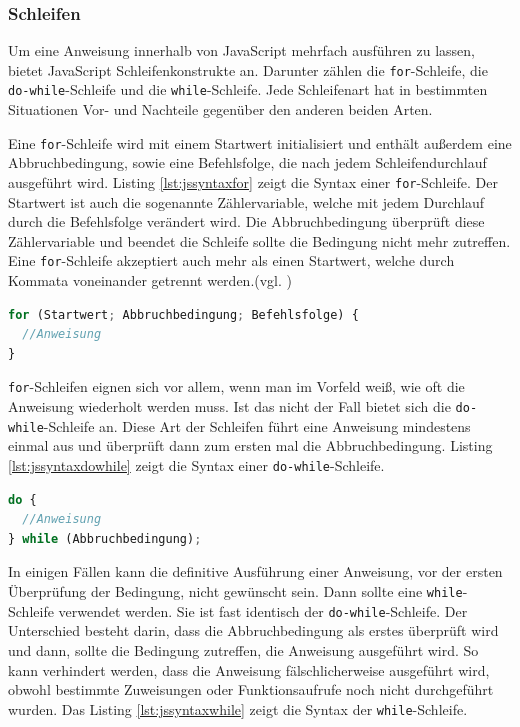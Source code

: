 \subsubsection{Schleifen} Um eine Anweisung innerhalb von JavaScript mehrfach ausführen zu lassen, bietet JavaScript Schleifenkonstrukte an. Darunter zählen die \texttt{for}-Schleife, die \texttt{do-while}-Schleife und die \texttt{while}-Schleife. Jede Schleifenart hat in bestimmten Situationen Vor- und Nachteile gegenüber den anderen beiden Arten.\par Eine \texttt{for}-Schleife wird mit einem Startwert initialisiert und enthält außerdem eine Abbruchbedingung, sowie eine Befehlsfolge, die nach jedem Schleifendurchlauf ausgeführt wird. Listing \ref{lst:jssyntaxfor} zeigt die Syntax einer \texttt{for}-Schleife. Der Startwert ist auch die sogenannte Zählervariable, welche mit jedem Durchlauf durch die Befehlsfolge verändert wird. Die Abbruchbedingung überprüft diese Zählervariable und beendet die Schleife sollte die Bedingung nicht mehr zutreffen. Eine \texttt{for}-Schleife akzeptiert auch mehr als einen Startwert, welche durch Kommata voneinander getrennt werden.(vgl. \cite[S.75f]{WenzJava2008})

\vspace{1em}
\begin{lstlisting}[language=JavaScript, caption=Syntax \texttt{for}-Schleife, label=lst:jssyntaxfor]
for (Startwert; Abbruchbedingung; Befehlsfolge) {
  //Anweisung
}
\end{lstlisting}
	
\texttt{for}-Schleifen eignen sich vor allem, wenn man im Vorfeld weiß, wie oft die Anweisung wiederholt werden muss. Ist das nicht der Fall bietet sich die \texttt{do-while}-Schleife an. Diese Art der Schleifen führt eine Anweisung mindestens einmal aus und überprüft dann zum ersten mal die Abbruchbedingung. Listing \ref{lst:jssyntaxdowhile} zeigt die Syntax einer \texttt{do-while}-Schleife.

\vspace{1em}
\begin{lstlisting}[language=JavaScript, caption=Syntax \texttt{do-while}-Schleife, label=lst:jssyntaxdowhile]
do {
  //Anweisung
} while (Abbruchbedingung);
\end{lstlisting}

In einigen Fällen kann die definitive Ausführung einer Anweisung, vor der ersten Überprüfung der Bedingung, nicht gewünscht sein. Dann sollte eine \texttt{while}-Schleife verwendet werden. Sie ist fast identisch der \texttt{do-while}-Schleife. Der Unterschied besteht darin, dass die Abbruchbedingung als erstes überprüft wird und dann, sollte die Bedingung zutreffen, die Anweisung ausgeführt wird. So kann verhindert werden, dass die Anweisung fälschlicherweise ausgeführt wird, obwohl bestimmte Zuweisungen oder Funktionsaufrufe noch nicht durchgeführt wurden. Das Listing \ref{lst:jssyntaxwhile} zeigt die Syntax der \texttt{while}-Schleife.

